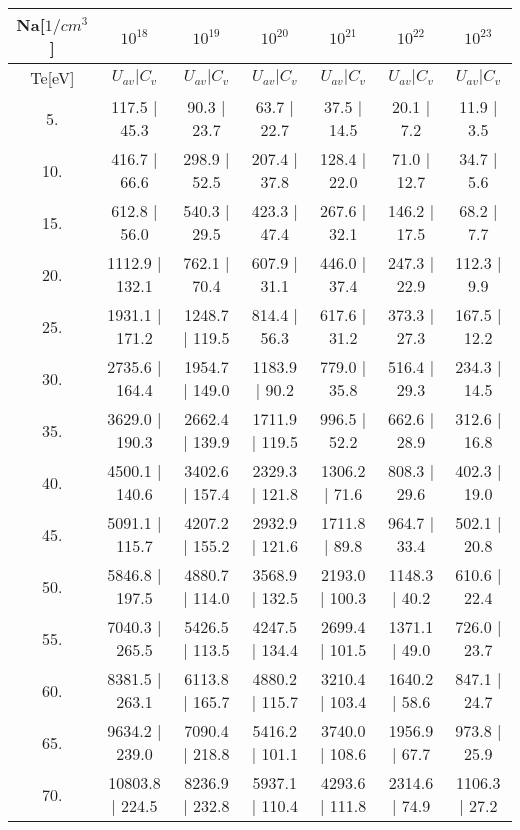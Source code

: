 \begin{tabular}{|c||c|c|c|c|c|c|}
\hline
Na[$1/cm^3$] & $10^{18}$ & $10^{19}$ & $10^{20}$ & $10^{21}$ & $10^{22}$ & $10^{23}$\tabularnewline
\hline
Te[eV] & $U_{av} | C_v$ & $U_{av} | C_v$ & $U_{av} | C_v$ & $U_{av} | C_v$ & $U_{av} | C_v$ & $U_{av} | C_v$\tabularnewline
\hline
\hline
   5. &    117.5 |    45.3 &     90.3 |    23.7 &     63.7 |    22.7 &     37.5 |    14.5 &     20.1 |     7.2 &     11.9 |     3.5\tabularnewline
\hline
  10. &    416.7 |    66.6 &    298.9 |    52.5 &    207.4 |    37.8 &    128.4 |    22.0 &     71.0 |    12.7 &     34.7 |     5.6\tabularnewline
\hline
  15. &    612.8 |    56.0 &    540.3 |    29.5 &    423.3 |    47.4 &    267.6 |    32.1 &    146.2 |    17.5 &     68.2 |     7.7\tabularnewline
\hline
  20. &   1112.9 |   132.1 &    762.1 |    70.4 &    607.9 |    31.1 &    446.0 |    37.4 &    247.3 |    22.9 &    112.3 |     9.9\tabularnewline
\hline
  25. &   1931.1 |   171.2 &   1248.7 |   119.5 &    814.4 |    56.3 &    617.6 |    31.2 &    373.3 |    27.3 &    167.5 |    12.2\tabularnewline
\hline
  30. &   2735.6 |   164.4 &   1954.7 |   149.0 &   1183.9 |    90.2 &    779.0 |    35.8 &    516.4 |    29.3 &    234.3 |    14.5\tabularnewline
\hline
  35. &   3629.0 |   190.3 &   2662.4 |   139.9 &   1711.9 |   119.5 &    996.5 |    52.2 &    662.6 |    28.9 &    312.6 |    16.8\tabularnewline
\hline
  40. &   4500.1 |   140.6 &   3402.6 |   157.4 &   2329.3 |   121.8 &   1306.2 |    71.6 &    808.3 |    29.6 &    402.3 |    19.0\tabularnewline
\hline
  45. &   5091.1 |   115.7 &   4207.2 |   155.2 &   2932.9 |   121.6 &   1711.8 |    89.8 &    964.7 |    33.4 &    502.1 |    20.8\tabularnewline
\hline
  50. &   5846.8 |   197.5 &   4880.7 |   114.0 &   3568.9 |   132.5 &   2193.0 |   100.3 &   1148.3 |    40.2 &    610.6 |    22.4\tabularnewline
\hline
  55. &   7040.3 |   265.5 &   5426.5 |   113.5 &   4247.5 |   134.4 &   2699.4 |   101.5 &   1371.1 |    49.0 &    726.0 |    23.7\tabularnewline
\hline
  60. &   8381.5 |   263.1 &   6113.8 |   165.7 &   4880.2 |   115.7 &   3210.4 |   103.4 &   1640.2 |    58.6 &    847.1 |    24.7\tabularnewline
\hline
  65. &   9634.2 |   239.0 &   7090.4 |   218.8 &   5416.2 |   101.1 &   3740.0 |   108.6 &   1956.9 |    67.7 &    973.8 |    25.9\tabularnewline
\hline
  70. &  10803.8 |   224.5 &   8236.9 |   232.8 &   5937.1 |   110.4 &   4293.6 |   111.8 &   2314.6 |    74.9 &   1106.3 |    27.2\tabularnewline

\end{tabular}
